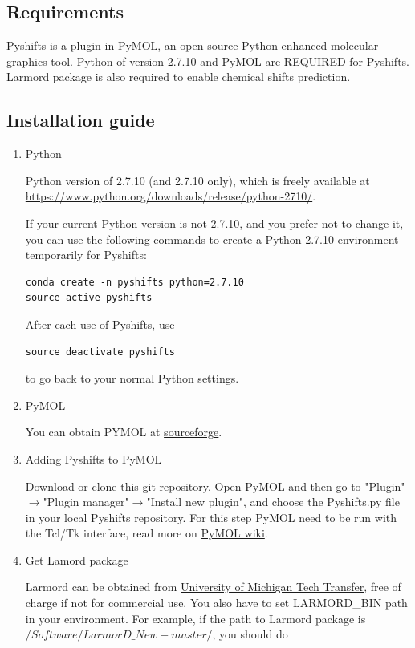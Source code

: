 \documentclass{article}
\begin{document}
\subsection{Requirements}
Pyshifts is a plugin in PyMOL, an open source Python-enhanced molecular graphics tool. Python of version 2.7.10 and PyMOL are REQUIRED for Pyshifts. Larmord package is also required to enable chemical shifts prediction.


\subsection{Installation guide}
\begin{enumerate}
\item{Python}

Python version of 2.7.10 (and 2.7.10 only), which is freely available at \url{https://www.python.org/downloads/release/python-2710/}.

If your current Python version is not 2.7.10, and you prefer not to change it, you can use the following commands to create a Python 2.7.10 environment temporarily for Pyshifts:

\begin{lstlisting}
conda create -n pyshifts python=2.7.10
source active pyshifts
\end{lstlisting}
After each use of Pyshifts, use
\begin{lstlisting}
source deactivate pyshifts
\end{lstlisting}
to go back to your normal Python settings.
\item{PyMOL}

You can obtain PYMOL at \href{https://sourceforge.net/projects/pymol/}{sourceforge}.

\item{Adding Pyshifts to PyMOL}

Download or clone this git repository.
Open PyMOL and then go to "Plugin"$\to$"Plugin manager"$\to$"Install new plugin", and choose the Pyshifts.py file in your local Pyshifts repository. For this step PyMOL need to be run with the Tcl/Tk interface, read more on \href{https://pymolwiki.org/index.php/Plugins}{PyMOL wiki}.


\item{Get Lamord package}

Larmord can be obtained from \href{http://inventions.umich.edu/technologies/6481_software-for-rna-structure-and-dynamics-elucidation-from-nmr-data}{University of Michigan Tech Transfer}, free of charge if not for commercial use. You also have to set LARMORD\_BIN path in your environment. For example, if the path to Larmord package is 
$/Software/LarmorD\_New-master/$, you should do


\end{enumerate}
\end{document}
